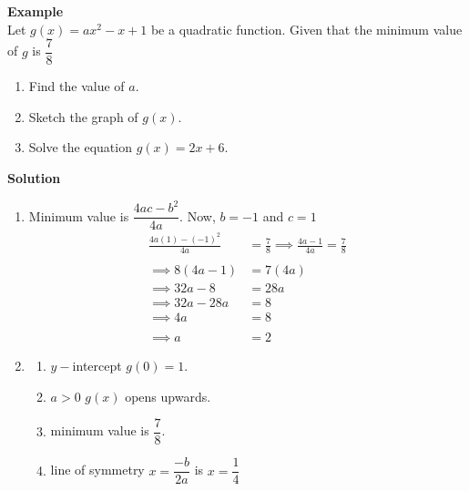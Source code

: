 \documentclass[11pt,a4paper]{article}
\begin{document}
\textbf{Example}\\
Let $g(x)=ax^2-x+1$ be a quadratic function. Given that the minimum value of $g$ is $\dfrac{7}{8}$
\begin{enumerate}
\item Find the value of $a$.
\item Sketch the graph of $g(x)$.
\item Solve the equation $g(x)=2x+6$.\\
\end{enumerate}

\textbf{Solution}
\begin{enumerate}
\item Minimum value is $\dfrac{4ac-b^2}{4a}$. Now, $b=-1$ and $c=1$
\begin{align*}
\frac{4a(1)-(-1)^2}{4a} & =\frac{7}{8}\implies \frac{4a-1}{4a}=\frac{7}{8}\\\\
\implies 8(4a-1) & = 7(4a)\\
\implies  32a-8 & = 28a\\
\implies 32a-28a & = 8\\
\implies 4a & = 8\\\\
\implies a & =2
\end{align*}
\item
\begin{enumerate}
    \item $y-$intercept $g(0)=1$.
    \item $a>0$ $g(x)$ opens upwards.
    \item minimum value is $\dfrac{7}{8}$.
    \item line of symmetry $x=\dfrac{-b}{2a}$ is $x=\dfrac{1}{4}$


\begin{figure}[H]
\centering
{}
\end{figure}



\end{enumerate}
\end{enumerate}
\end{document}
